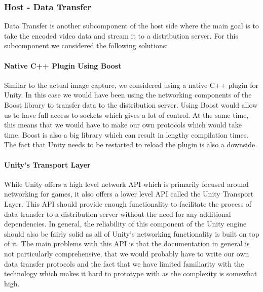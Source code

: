 \subsubsection{Host - Data Transfer} %
Data Transfer is another subcomponent of the host side where the main goal is to take the encoded video data and stream it to a distribution server. For this subcomponent we considered the following solutions:

\paragraph{Native C++ Plugin Using Boost}
Similar to the actual image capture, we considered using a native C++ plugin for Unity. In this case we would have been using the networking components of the Boost library\cite{boost} to transfer data to the distribution server. Using Boost would allow us to have full access to sockets which gives a lot of control. At the same time, this means that we would have to make our own protocols which would take time. Boost is also a big library which can result in lengthy compilation times. The fact that Unity needs to be restarted to reload the plugin is also a downside. 

\paragraph{Unity's Transport Layer}
While Unity offers a high level network API which is primarily focused around networking for games, it also offers a lower level API called the Unity Transport Layer\cite{unity_transportLayer}. This API should provide enough functionality to facilitate the process of data transfer to a distribution server without the need for any additional dependencies. In general, the reliability of this component of the Unity engine should also be fairly solid as all of Unity's networking functionality is built on top of it. The main problems with this API is that the documentation in general is not particularly comprehensive, that we would probably have to write our own data transfer protocols and the fact that we have limited familiarity with the technology which makes it hard to prototype with as the complexity is somewhat high. 

